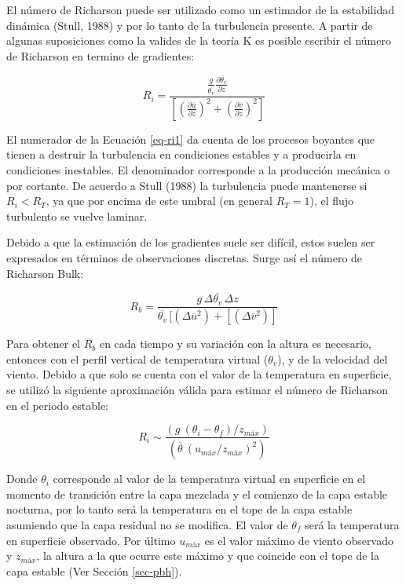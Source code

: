 \documentclass[12pt,spanish,oneside]{book}
\begin{document}
El número de Richarson puede ser utilizado como un estimador de la
estabilidad dinámica (Stull, 1988) y por lo tanto de la turbulencia
presente. A partir de algunas suposiciones como la valides de la teoría
K es posible escribir el número de Richarson en termino de gradientes:

\begin{equation} \label{eq-ri1}
R_i = \frac{\frac{g}{\overline{\theta_v}} \frac{\partial \overline{\theta_v}}{\partial z}}
{\left [ \left (\frac{\partial \overline{u}}{\partial z} \right )^2 + \left (\frac{\partial \overline{v}}{\partial z} \right )^2  \right]}
\end{equation}

El numerador de la Ecuación \ref{eq-ri1} da cuenta de los procesos
boyantes que tienen a destruir la turbulencia en condiciones estables y
a producirla en condiciones inestables. El denominador corresponde a la
producción mecánica o por cortante. De acuerdo a Stull (1988) la
turbulencia puede mantenerse si \(R_i < R_T\), ya que por encima de este
umbral (en general \(R_T = 1\)), el flujo turbulento se vuelve laminar.

Debido a que la estimación de los gradientes suele ser difícil, estos
suelen ser expresados en términos de observaciones discretas. Surge así
el número de Richarson Bulk:

\begin{equation} \label{eq-ri2}
R_b = \frac{g \, \Delta \overline{\theta_v} \, \Delta z}{\overline{\theta_v} \, [(\Delta \overline{u}^2) + [(\Delta \overline{v}^2)]}
\end{equation}

Para obtener el \(R_b\) en cada tiempo y su variación con la altura es
necesario, entonces con el perfil vertical de temperatura virtual
(\(\theta_v\)), y de la velocidad del viento. Debido a que solo se
cuenta con el valor de la temperatura en superficie, se utilizó la
siguiente aproximación válida para estimar el número de Richarson en el
periodo estable:

\begin{equation} \label{eq-ri3}
R_i \sim \frac{(g  \: (\theta_i - \theta_f)/z_{máx})}{(\overline{\theta} \: (u_{máx}/z_{máx})^2)}
\end{equation}

Donde \(\theta_i\) corresponde al valor de la temperatura virtual en
superficie en el momento de transición entre la capa mezclada y el
comienzo de la capa estable nocturna, por lo tanto será la temperatura
en el tope de la capa estable asumiendo que la capa residual no se
modifica. El valor de \(\theta_f\) será la temperatura en superficie
observado. Por último \(u_{máx}\) es el valor máximo de viento observado
y \(z_{máx}\), la altura a la que ocurre este máximo y que coincide con
el tope de la capa estable (Ver Sección \ref{sec-pbh}).
\end{document}

